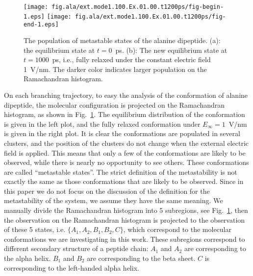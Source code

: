 \documentclass[a4paper,preprint,unsortedaddress,onecolumn]{revtex4-1}
\begin{document}
\begin{figure}
  \centering
  \texttt{[image: fig.ala/ext.mode1.100.Ex.01.00.t1200ps/fig-begin-1.eps]}
  \texttt{[image: fig.ala/ext.mode1.100.Ex.01.00.t1200ps/fig-end-1.eps]}
  \caption{The population of metastable states of the alanine dipeptide.
    (a): the
    equilibrium state at $t=0$~\textsf{ps}. (b): The new equilibrium
    state at $t=1000$~\textsf{ps}, i.e., fully relaxed under the
    constant electric field 1~V/nm. The darker color
    indicates larger population on the Ramachandran histogram.}
  \label{fig:tmp4}
\end{figure}


On each branching trajectory, to easy the analysis of the conformation
of alanine dipeptide, the molecular configuration is projected on
the Ramachandran histogram, as
shown in Fig.~\ref{fig:tmp4}. The equilibrium distribution of the
conformation is given in the left plot, and the fully relaxed
conformation under $E_{\infty} = 1$~V/nm is given in the right plot.  It is
clear the conformations are populated in several clusters, and the
position of the clusters do not change when the external electric
field is applied.
This means that only a few of the conformations are likely to be observed,
while there is nearly no opportunity to see others. 
These conformations are called ``metastable states''.
The strict definition of the
metastability is not exactly the same as those conformations that are likely to be observed.
Since in this paper we do not focus on the discussion of the definition for the metastability of the system,
we assume they have the same meaning.
We manually divide the
Ramachandran histogram into 5 subregions, see Fig.~\ref{fig:tmp4},
then the observation on the Ramachandran histogram is projected to the
observation of these 5 states, i.e. $\{A_1, A_2, B_1, B_2, C\}$, which
correspond to the molecular conformations we are investigating in this work.
These subregions
correspond to different secondary structure of a peptide chain:
$A_1$ and $A_2$ are
corresponding to the alpha helix. $B_1$ and $B_2$ are
corresponding to the beta sheet. $C$ is corresponding to the
left-handed alpha helix.
\end{document}
